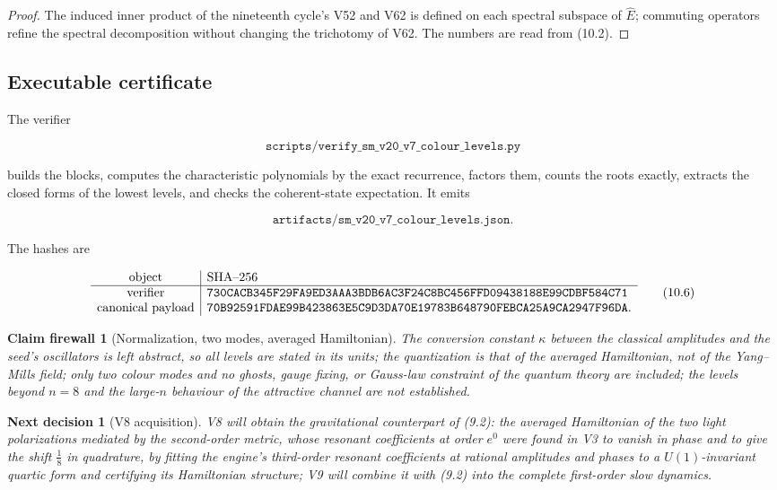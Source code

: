 \documentclass[11pt]{article}
\newtheorem{firewall}[theorem]{Claim firewall}
\newtheorem{decision}[theorem]{Next decision}
\theoremstyle{remark}
\begin{document}
\begin{proof}
The induced inner product of the nineteenth cycle's V52 and V62 is
defined on each spectral subspace of \(\widehat E\); commuting
operators refine the spectral decomposition without changing the
trichotomy of V62.  The numbers are read from (10.2).
\end{proof}

\subsection{Executable certificate}

The verifier

\[
 \texttt{scripts/verify\_sm\_v20\_v7\_colour\_levels.py}              \tag{10.4}
\]

builds the blocks, computes the characteristic polynomials by the
exact recurrence, factors them, counts the roots exactly, extracts
the closed forms of the lowest levels, and checks the coherent-state
expectation.  It emits

\[
 \texttt{artifacts/sm\_v20\_v7\_colour\_levels.json}.                 \tag{10.5}
\]

The hashes are

\[
\begin{array}{c|l}
\hbox{object}&\hbox{SHA--256}\\ \hline
\hbox{verifier}&
\texttt{730CACB345F29FA9ED3AAA3BDB6AC3F24C8BC456FFD09438188E99CDBF584C71}\\
\hbox{canonical payload}&
\texttt{70B92591FDAE99B423863E5C9D3DA70E19783B648790FEBCA25A9CA2947F96DA}.
\end{array}                                                     \tag{10.6}
\]

\begin{firewall}[Normalization, two modes, averaged Hamiltonian]
\label{fire:v20v7}
The conversion constant \(\kappa\) between the classical amplitudes
and the seed's oscillators is left abstract, so all levels are stated
in its units; the quantization is that of the averaged Hamiltonian,
not of the Yang--Mills field; only two colour modes and no ghosts,
gauge fixing, or Gauss-law constraint of the quantum theory are
included; the levels beyond \(n=8\) and the large-\(n\) behaviour of
the attractive channel are not established.
\end{firewall}

\begin{decision}[V8 acquisition]
\label{dec:v20v7-next}
V8 will obtain the gravitational counterpart of (9.2): the averaged
Hamiltonian of the two light polarizations mediated by the
second-order metric, whose resonant coefficients at order \(e^0\) were
found in V3 to vanish in phase and to give the shift \(\tfrac18\) in
quadrature, by fitting the engine's third-order resonant coefficients
at rational amplitudes and phases to a \(U(1)\)-invariant quartic
form and certifying its Hamiltonian structure; V9 will combine it
with (9.2) into the complete first-order slow dynamics.
\end{decision}
\end{document}
